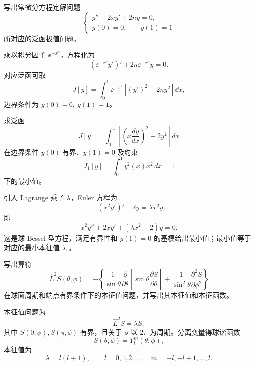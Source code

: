 \begin{question}
写出常微分方程定解问题
\[
\begin{cases}
y''-2xy'+2ny=0,\\
y(0)=0,\qquad y(1)=1
\end{cases}
\]
所对应的泛函极值问题。
\begin{solution}
乘以积分因子 \(\ee^{-x^2}\)，方程化为
\[
\left(\ee^{-x^2}y'\right)'+2n\ee^{-x^2}y=0.
\]
对应泛函可取
\[
J[y]=\int_0^1 \ee^{-x^2}\left[(y')^2-2ny^2\right]\dd{x},
\]
边界条件为 \(y(0)=0,\ y(1)=1\)。
\end{solution}
\end{question}

\begin{question}
求泛函
\[
J[y]=\int_0^1\left[\left(x\frac{dy}{dx}\right)^2+2y^2\right]dx
\]
在边界条件 \(y(0)\) 有界、\(y(1)=0\) 及约束
\[
J_1[y]=\int_0^1y^2(x)x^2\,dx=1
\]
下的最小值。
\begin{solution}
引入 Lagrange 乘子 \(\lambda\)，Euler 方程为
\[
-(x^2y')'+2y=\lambda x^2y,
\]
即
\[
x^2y''+2xy'+(\lambda x^2-2)y=0.
\]
这是球 Bessel 型方程，满足有界性和 \(y(1)=0\) 的基模给出最小值；最小值等于对应的最小本征值 \(\lambda_1\)。
\end{solution}
\end{question}

\begin{question}
写出算符
\[
\hat L^2S(\theta,\phi)=-\left\{\frac1{\sin\theta}\frac\partial{\partial\theta}\left[\sin\theta\frac{\partial S}{\partial\theta}\right]+\frac1{\sin^2\theta}\frac{\partial^2S}{\partial\phi^2}\right\}
\]
在球面周期和端点有界条件下的本征值问题，并写出其本征值和本征函数。
\begin{solution}
本征值问题为
\[
\hat L^2S=\lambda S,
\]
其中 \(S(0,\phi),S(\pi,\phi)\) 有界，且关于 \(\phi\) 以 \(2\pi\) 为周期。分离变量得球谐函数
\[
S(\theta,\phi)=Y_l^m(\theta,\phi),
\]
本征值为
\[
\lambda=l(l+1),\qquad l=0,1,2,\ldots,
\quad m=-l,-l+1,\ldots,l.
\]
\end{solution}
\end{question}


